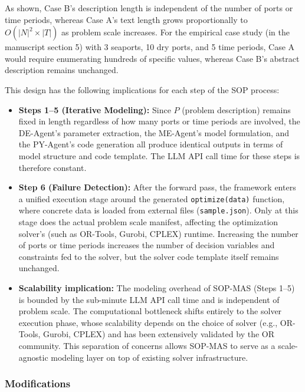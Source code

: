 \documentclass[11pt,a4paper]{article}
\begin{document}
\noindent As shown, Case B's description length is independent of the number of ports or time periods, whereas Case A's text length grows proportionally to $O(|N|^2 \times |T|)$ as problem scale increases. For the empirical case study (in the manuscript section 5) with 3 seaports, 10 dry ports, and 5 time periods, Case A would require enumerating hundreds of specific values, whereas Case B's abstract description remains unchanged.

This design has the following implications for each step of the SOP process:

\begin{itemize}
\item \textbf{Steps 1--5 (Iterative Modeling):} Since $P$ (problem description) remains fixed in length regardless of how many ports or time periods are involved, the DE-Agent's parameter extraction, the ME-Agent's model formulation, and the PY-Agent's code generation all produce identical outputs in terms of model structure and code template. The LLM API call time for these steps is therefore constant.

\item \textbf{Step 6 (Failure Detection):} After the forward pass, the framework enters a unified execution stage around the generated \texttt{optimize(data)} function, where concrete data is loaded from external files (\texttt{sample.json}). Only at this stage does the actual problem scale manifest, affecting the optimization solver's (such as OR-Tools, Gurobi, CPLEX) runtime. Increasing the number of ports or time periods increases the number of decision variables and constraints fed to the solver, but the solver code template itself remains unchanged.

\item \textbf{Scalability implication:} The modeling overhead of SOP-MAS (Steps 1--5) is bounded by the sub-minute LLM API call time and is independent of problem scale. The computational bottleneck shifts entirely to the solver execution phase, whose scalability depends on the choice of solver (e.g., OR-Tools, Gurobi, CPLEX) and has been extensively validated by the OR community. This separation of concerns allows SOP-MAS to serve as a scale-agnostic modeling layer on top of existing solver infrastructure.
\end{itemize}


\subsubsection{Modifications}
\end{document}

